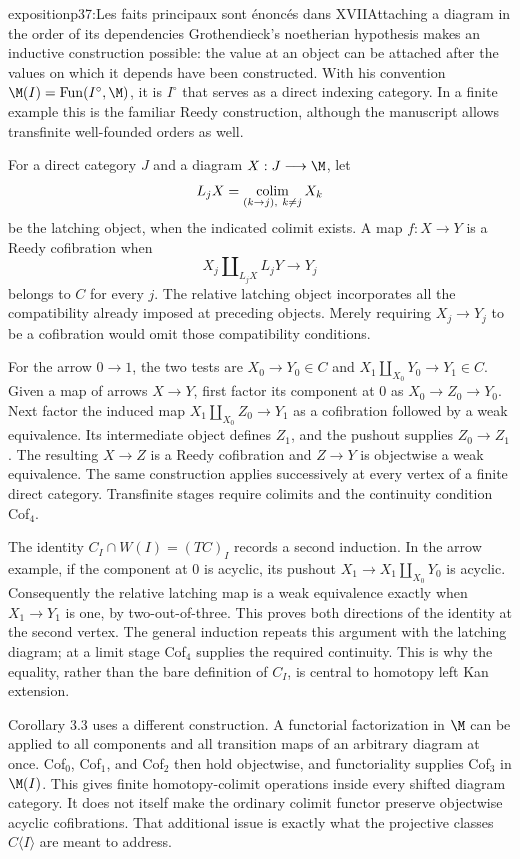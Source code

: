 \begin{dcomment}{exposition}{p37:Les faits principaux sont énoncés dans XVII}{Attaching a diagram in the order of its dependencies}
Grothendieck's noetherian hypothesis makes an inductive construction possible: the value at an object can be attached after the values on which it depends have been constructed. With his convention $\M(I)=\operatorname{Fun}(I^\circ,\M)$, it is $I^\circ$ that serves as a direct indexing category. In a finite example this is the familiar Reedy construction, although the manuscript allows transfinite well-founded orders as well.

For a direct category $J$ and a diagram $X:J\longrightarrow\M$, let
\[
 L_jX=\mathop{\rm colim}_{(k\to j),\ k\ne j}X_k
\]
be the latching object, when the indicated colimit exists. A map $f:X\longrightarrow Y$ is a Reedy cofibration when
\[
 X_j\amalg_{L_jX}L_jY\longrightarrow Y_j
\]
belongs to $C$ for every $j$. The relative latching object incorporates all the compatibility already imposed at preceding objects. Merely requiring $X_j\longrightarrow Y_j$ to be a cofibration would omit those compatibility conditions.

For the arrow $0\to1$, the two tests are $X_0\to Y_0\in C$ and
$X_1\amalg_{X_0}Y_0\to Y_1\in C$. Given a map of arrows $X\to Y$, first factor its component at $0$ as $X_0\to Z_0\to Y_0$. Next factor the induced map $X_1\amalg_{X_0}Z_0\to Y_1$ as a cofibration followed by a weak equivalence. Its intermediate object defines $Z_1$, and the pushout supplies $Z_0\to Z_1$. The resulting $X\to Z$ is a Reedy cofibration and $Z\to Y$ is objectwise a weak equivalence. The same construction applies successively at every vertex of a finite direct category. Transfinite stages require colimits and the continuity condition Cof$_4$.

The identity $C_I\cap W(I)=(TC)_I$ records a second induction. In the arrow example, if the component at $0$ is acyclic, its pushout $X_1\to X_1\amalg_{X_0}Y_0$ is acyclic. Consequently the relative latching map is a weak equivalence exactly when $X_1\to Y_1$ is one, by two-out-of-three. This proves both directions of the identity at the second vertex. The general induction repeats this argument with the latching diagram; at a limit stage Cof$_4$ supplies the required continuity. This is why the equality, rather than the bare definition of $C_I$, is central to homotopy left Kan extension.

Corollary 3.3 uses a different construction. A functorial factorization in $\M$ can be applied to all components and all transition maps of an arbitrary diagram at once. Cof$_0$, Cof$_1$, and Cof$_2$ then hold objectwise, and functoriality supplies Cof$_3$ in $\M(I)$. This gives finite homotopy-colimit operations inside every shifted diagram category. It does not itself make the ordinary colimit functor preserve objectwise acyclic cofibrations. That additional issue is exactly what the projective classes $C\langle I\rangle$ are meant to address.
\end{dcomment}

